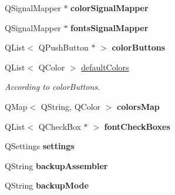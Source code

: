 \begin{DoxyCompactItemize}
\item 
\hypertarget{class_main_window_a4fd9ec8df088f03433cb7937adadcc34}{}Q\+Signal\+Mapper $\ast$ {\bfseries color\+Signal\+Mapper}\label{class_main_window_a4fd9ec8df088f03433cb7937adadcc34}

\item 
\hypertarget{class_main_window_a0ede638df0e7f1ed317c83ebdf790c7e}{}Q\+Signal\+Mapper $\ast$ {\bfseries fonts\+Signal\+Mapper}\label{class_main_window_a0ede638df0e7f1ed317c83ebdf790c7e}

\item 
\hypertarget{class_main_window_afdd7b3115692de072db9504d38449ae9}{}Q\+List$<$ Q\+Push\+Button $\ast$ $>$ {\bfseries color\+Buttons}\label{class_main_window_afdd7b3115692de072db9504d38449ae9}

\item 
\hypertarget{class_main_window_aabb23f3b2db87626123838f7705f3f15}{}Q\+List$<$ Q\+Color $>$ \hyperlink{class_main_window_aabb23f3b2db87626123838f7705f3f15}{default\+Colors}\label{class_main_window_aabb23f3b2db87626123838f7705f3f15}

\begin{DoxyCompactList}\small\item\em According to color\+Buttons. \end{DoxyCompactList}\item 
\hypertarget{class_main_window_a3b3d9502ca6548f19f81b3e9921e8e1f}{}Q\+Map$<$ Q\+String, Q\+Color $>$ {\bfseries colors\+Map}\label{class_main_window_a3b3d9502ca6548f19f81b3e9921e8e1f}

\item 
\hypertarget{class_main_window_a41a492577e8a6dd51b9b9a78a236c6c0}{}Q\+List$<$ Q\+Check\+Box $\ast$ $>$ {\bfseries font\+Check\+Boxes}\label{class_main_window_a41a492577e8a6dd51b9b9a78a236c6c0}

\item 
\hypertarget{class_main_window_a87b5b9562fe91ee19249f5a0d7617ce0}{}Q\+Settings {\bfseries settings}\label{class_main_window_a87b5b9562fe91ee19249f5a0d7617ce0}

\item 
\hypertarget{class_main_window_aa9410fd13b6463955726d700de837323}{}Q\+String {\bfseries backup\+Assembler}\label{class_main_window_aa9410fd13b6463955726d700de837323}

\item 
\hypertarget{class_main_window_a6ebfecf17b4a7b7931daa5198fbc0b44}{}Q\+String {\bfseries backup\+Mode}\label{class_main_window_a6ebfecf17b4a7b7931daa5198fbc0b44}


\end{DoxyCompactItemize}
